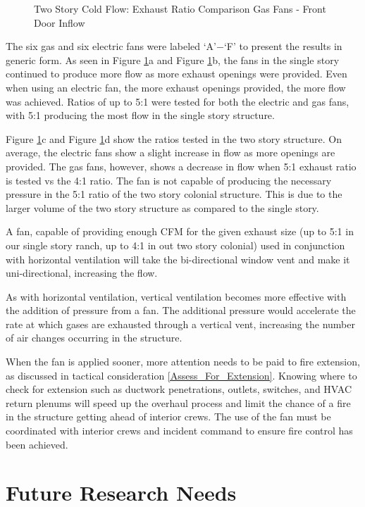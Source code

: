 \documentclass{article}
\begin{document}
\begin{figure}[H]
\begin{tabular}{*2c}
	\end{tabular}
	\caption{Two Story Cold Flow: Exhaust Ratio Comparison Gas Fans - Front Door Inflow}
	\label{fig:MoreFlowTC}
\end{figure}

The six gas and six electric fans were labeled `A'$-$`F' to present the results in generic form. As seen in Figure \ref{fig:MoreFlowTC}a and Figure \ref{fig:MoreFlowTC}b, the fans in the single story continued to produce more flow as more exhaust openings were provided. Even when using an electric fan, the more exhaust openings provided, the more flow was achieved. Ratios of up to 5:1 were tested for both the electric and gas fans, with 5:1 producing the most flow in the single story structure. 

Figure \ref{fig:MoreFlowTC}c and Figure \ref{fig:MoreFlowTC}d show the ratios tested in the two story structure. On average, the electric fans show a slight increase in flow as more openings are provided. The gas fans, however, shows a decrease in flow when 5:1 exhaust ratio is tested vs the 4:1 ratio. The fan is not capable of producing the necessary pressure in the 5:1 ratio of the two story colonial structure. This is due to the larger volume of the two story structure as compared to the single story.

A fan, capable of providing enough CFM for the given exhaust size (up to 5:1 in our single story ranch, up to 4:1 in out two story colonial) used in conjunction with horizontal ventilation will take the bi-directional window vent and make it uni-directional, increasing the flow.

As with horizontal ventilation, vertical ventilation becomes more effective with the addition of pressure from a fan. The additional pressure would accelerate the rate at which gases are exhausted through a vertical vent, increasing the number of air changes occurring in the structure.

When the fan is applied sooner, more attention needs to be paid to fire extension, as discussed in tactical consideration \ref{Assess_For_Extension}. Knowing where to check for extension such as ductwork penetrations, outlets, switches, and HVAC return plenums will speed up the overhaul process and limit the chance of a fire in the structure getting ahead of interior crews.  The use of the fan must be coordinated with interior crews and incident command to ensure fire control has been achieved.  

\section{Future Research Needs}
\end{document}

